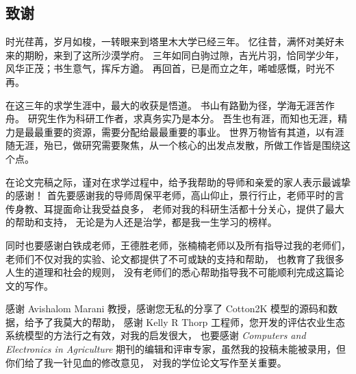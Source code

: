 \documentclass[a4paper,oneside,zihao=-4,AutoFakeBold,fontset=windows]{ctexbook}
\begin{document}
\pagestyle{empty}
\frontmatter

%


\tableofcontents
\newpage
\mainmatter
\pagestyle{fancy}
\setcounter{page}{1}
\begin{spacing}{}
  
  
  
  
  
  
  \backmatter
  \printbibliography
  \chapter*{致谢}

  时光荏苒，岁月如梭，一转眼来到塔里木大学已经三年。%
  忆往昔，满怀对美好未来的期盼，来到了这所沙漠学府。%
  三年如同白驹过隙，吉光片羽，恰同学少年，风华正茂；书生意气，挥斥方遒。%
  再回首，已是而立之年，唏嘘感慨，时光不再。  

  在这三年的求学生涯中，最大的收获是悟道。%
  书山有路勤为径，学海无涯苦作舟。%
  研究生作为科研工作者，求真务实乃是本分。%
  吾生也有涯，而知也无涯，精力是最最重要的资源，需要分配给最最重要的事业。%
  世界万物皆有其道，以有涯随无涯，殆已，做研究需要聚焦，从一个核心的出发点发散，所做工作皆是围绕这个点。%

  在论文完稿之际，谨对在求学过程中，给予我帮助的导师和亲爱的家人表示最诚挚的感谢！%
  首先要感谢我的导师周保平老师，高山仰止，景行行止，老师平时的言传身教、耳提面命让我受益良多，%
  老师对我的科研生活都十分关心，提供了最大的帮助和支持，%
  无论是为人还是治学，都是我一生学习的榜样。%

  同时也要感谢白铁成老师，王德胜老师，张楠楠老师以及所有指导过我的老师们，%
  老师们不仅对我的实验、论文都提供了不可或缺的支持和帮助，%
  也教育了我很多人生的道理和社会的规则，%
  没有老师们的悉心帮助指导我不可能顺利完成这篇论文的写作。%

  感谢 Avishalom Marani 教授，感谢您无私的分享了 Cotton2K 模型的源码和数据，给予了我莫大的帮助，%
  感谢 Kelly R Thorp 工程师，您开发的评估农业生态系统模型的方法行之有效，对我的启发很大，%
  也要感谢 \textit{Computers and Electronics in Agriculture} 期刊的编辑和评审专家，虽然我的投稿未能被录用，但你们给了我一针见血的修改意见，%
  对我的学位论文写作至关重要。


\end{spacing}
\end{document}
